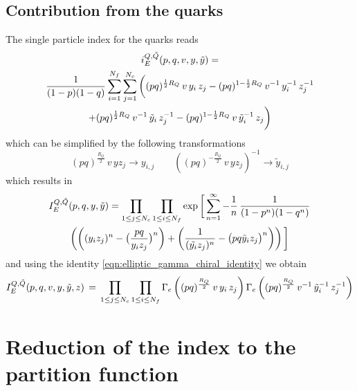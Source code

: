 \begin{appendices}
\section{Contribution from the quarks}

The single particle index for the quarks reads
\begin{multline}
i_E^{Q,\tilde{Q}} (p,q,v,y,\tilde{y})=\\ 
{1\over (1-p)(1-q)} \sum_{i=1}^{N_f} \sum_{j=1}^{N_c}
\bigg(
(p q)^{{1\over 2}R_Q} \, v \, y_i \, z_j
- (p q)^{1- {1\over 2} R_Q} \, v^{-1} \, y_i^{-1} \, z_j^{-1} \\
 + 
(p q)^{{1\over 2}R_Q}\, v^{-1}\, {\tilde y}_i \,z_j^{-1}
- (p q)^{1- {1\over 2}R_Q} \, v\, {\tilde y_i}^{-1}\, z_j\bigg) 
\end{multline}
which can be simplified by the following transformations
\begin{equation}
(pq)^{\frac{R_Q}{2}} \, v \, y z_j \rightarrow  y_{i,j} \qquad 
\left( (pq)^{- \frac{R_Q}{2}} \, v \, y z_j \right)^{-1}\rightarrow  \tilde{y}_{i,j}
\end{equation}
which results in
\begin{multline}
I_E^{Q,\tilde{Q}}(p,q,y,\tilde{y})  =
\prod_{ 1 \leq j \leq N_c} \prod_{ 1 \leq i \leq N_f} \exp \bigg[ \sum_{n=1}^{\infty} - {1 \over n} \, {1 \over (1-p^n)( 1-q^n)}
\\
\left( \bigg( (y_i z_j)^n - \big({ pq \over y_i z_j}\big)^n \bigg) + \left(  {1 \over  (\tilde{y_i} z_j)^n } - \big( { pq \tilde y_i z_j} \big)^n \right)  \right) \bigg]
\end{multline}
and using the identity \eqref{eqn:elliptic_gamma_chiral_identity} we obtain
\begin{equation}
I_E^{Q,\tilde{Q}} ( p ,q,v,y,\tilde{y},z) \, = \, \prod_{ 1 \leq j \leq N_c} \prod_{ 1 \leq i \leq N_f} \Gamma_e \left( (pq)^{R_Q \over 2} \, v  \,  y_i \,  z_j \right)
\Gamma_e \left( (pq)^{R_Q \over 2}\,  v^{-1} \,  {\tilde y_i}^{-1}\,  z_j^{-1}\right)
\end{equation}

\chapter{Reduction of the index to the partition function}
\label{appendix:reduction_index_to_pf}
\begin{comment}

\end{comment}
\end{appendices}

